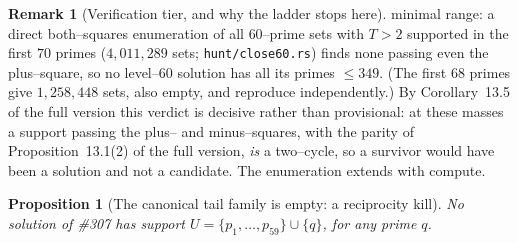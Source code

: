 \documentclass[11pt]{article}
\newtheorem{proposition}[theorem]{Proposition}
\theoremstyle{definition}
\newtheorem{remark}[theorem]{Remark}
\begin{document}
\begin{remark}[Verification tier, and why the ladder stops here]
minimal range: a direct both--squares enumeration of all $60$--prime sets with $T>2$ supported in
the first $70$ primes ($4{,}011{,}289$ sets; \texttt{hunt/close60.rs}) finds none passing even the
plus--square, so no level--$60$ solution has all its primes $\le349$. (The first $68$ primes give
$1{,}258{,}448$ sets, also empty, and reproduce independently.) By
Corollary~13.5 of the full version this verdict is decisive rather than provisional: at these masses a
support passing the plus-- and minus--squares, with the parity of Proposition~13.1(2) of the full version,
\emph{is} a two--cycle, so a survivor would have been a solution and not a candidate. The
enumeration extends with compute.
\end{remark}

\begin{proposition}[The canonical tail family is empty: a reciprocity kill]\label{prop:tailkill}
No solution of \#307 has support $U=\{p_1,\dots,p_{59}\}\cup\{q\}$, for any prime $q$.
\end{proposition}
\end{document}
